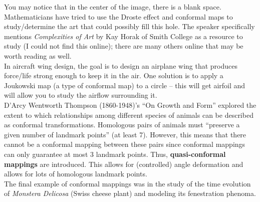 \documentclass[12pt]{amsart}
\begin{document}
You may notice that in the center of the image, there is a blank space. Mathematicians have tried to use the Droste effect and conformal maps to study/determine the art that could possibly fill this hole. The speaker specifically mentions \textit{Complexities of Art} by Kay Horak of Smith College as a resource to study (I could not find this online); 
there are many others online that may be worth reading as well. \\

In aircraft wing design, the goal is to design an airplane wing that produces force/life strong enough to keep it in the air. One solution is to apply a Joukowski map (a type of conformal map) to a circle -- this will get airfoil and will allow you to study the airflow surrounding it. \\

D'Arcy Wentworth Thompson (1860-1948)'s ``On Growth and Form'' explored the extent to which relationships among different species of animals can be described as conformal transformations. Homologous pairs of animals must ``preserve a given number of landmark points'' (at least 7). However, this means that there cannot be a conformal mapping between 
these pairs since conformal mappings can only guarantee at most 3 landmark points. Thus, \textbf{quasi-conformal mappings} are introduced. This allows for (controlled) angle deformation and allows for lots of homologous landmark points. \\

The final example of conformal mappings was in the study of the time evolution of \textit{Monstera Delicosa} (Swiss cheese plant) and modeling its fenestration phenoma. \\

\newpage
\end{document}
